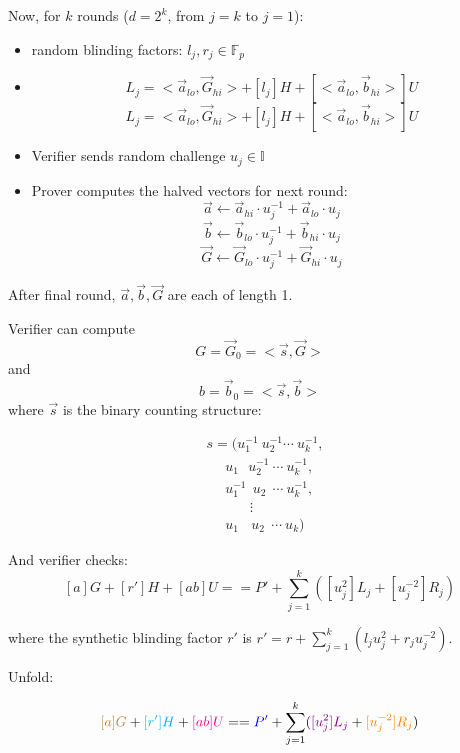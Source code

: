\documentclass{article}
\theoremstyle{definition}
\begin{document}
Now, for $k$ rounds ($d=2^k$, from $j=k$ to $j=1$):
\begin{itemize}
    \item random blinding factors: $l_j, r_j \in \mathbb{F}_p$
    \item
	$$L_j = < \overrightarrow{a}_{lo}, \overrightarrow{G}_{hi}> + [l_j] H + [< \overrightarrow{a}_{lo}, \overrightarrow{b}_{hi}>] U$$
	$$L_j = < \overrightarrow{a}_{lo}, \overrightarrow{G}_{hi}> + [l_j] H + [< \overrightarrow{a}_{lo}, \overrightarrow{b}_{hi}>] U$$
    \item Verifier sends random challenge $u_j \in \mathbb{I}$
    \item Prover computes the halved vectors for next round:
	$$\overrightarrow{a} \leftarrow \overrightarrow{a}_{hi} \cdot u_j^{-1} + \overrightarrow{a}_{lo} \cdot u_j$$
	$$\overrightarrow{b} \leftarrow \overrightarrow{b}_{lo} \cdot u_j^{-1} + \overrightarrow{b}_{hi} \cdot u_j$$
	$$\overrightarrow{G} \leftarrow \overrightarrow{G}_{lo} \cdot u_j^{-1} + \overrightarrow{G}_{hi} \cdot u_j$$
\end{itemize}

After final round, $\overrightarrow{a}, \overrightarrow{b}, \overrightarrow{G}$ are each of length 1.

Verifier can compute
$$G = \overrightarrow{G}_0 = < \overrightarrow{s}, \overrightarrow{G} >$$
and $$b = \overrightarrow{b}_0 = < \overrightarrow{s}, \overrightarrow{b} >$$
where $\overrightarrow{s}$ is the binary counting structure:

\begin{align*}
    &s = (u_1^{-1} ~ u_2^{-1} \cdots ~u_k^{-1},\\
    &~~~~~~u_1 ~~~ u_2^{-1} ~\cdots ~u_k^{-1},\\
    &~~~~~~u_1^{-1} ~~ u_2 ~~\cdots ~u_k^{-1},\\
    &~~~~~~~~~~~~~~\vdots\\
    &~~~~~~u_1 ~~~~ u_2 ~~\cdots ~u_k)
\end{align*}


And verifier checks:
$$[a]G + [r'] H + [ab] U == P' + \sum_{j=1}^k ( [u_j^2] L_j + [u_j^{-2}] R_j)$$

where the synthetic blinding factor $r'$ is $r' = r + \sum_{j=1}^k (l_j u_j^2 + r_j u_j^{-2})$.

\vspace{1cm}

Unfold:

$$
\textcolor{brown}{[a]G} + \textcolor{cyan}{[r'] H} + \textcolor{magenta}{[ab] U}
==
\textcolor{blue}{P'} + \sum_{j=1}^k ( \textcolor{violet}{[u_j^2] L_j} + \textcolor{orange}{[u_j^{-2}] R_j})
$$
\end{document}
